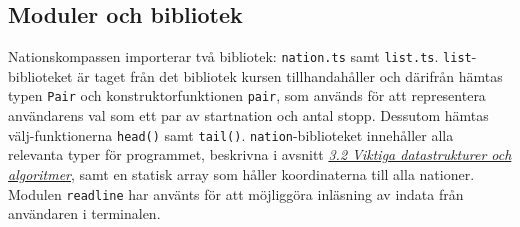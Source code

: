 \documentclass[a4paper, 12pt]{article}
\begin{document}
    \subsection{Moduler och bibliotek}
    \label{subsec: modul_och_bib}
        Nationskompassen importerar två bibliotek: \texttt{nation.ts} samt \texttt{list.ts}. \texttt{list}-biblioteket är taget från det bibliotek kursen tillhandahåller och därifrån hämtas typen \texttt{Pair} och konstruktorfunktionen \texttt{pair}, som används för att representera användarens val som ett par av startnation och antal stopp. Dessutom hämtas välj-funktionerna \texttt{head()} samt \texttt{tail()}. \texttt{nation}-biblioteket innehåller alla relevanta typer för programmet, beskrivna i avsnitt \hyperref[subsec: DSAL]{\textit{3.2 Viktiga datastrukturer och algoritmer}}, samt en statisk array som håller koordinaterna till alla nationer. Modulen \texttt{readline} har använts för att möjliggöra inläsning av indata från användaren i terminalen.
\end{document}
